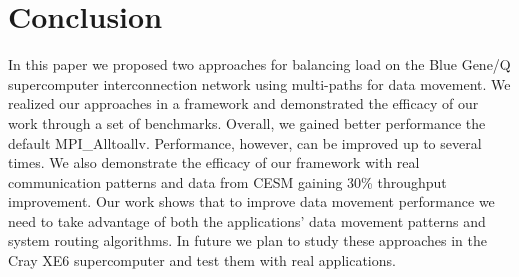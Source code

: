 \section{Conclusion}
\label{sec:conclusion}

In this paper we proposed two approaches for balancing load on the Blue Gene/Q supercomputer interconnection network using multi-paths for data movement. We realized our approaches in a framework and demonstrated the efficacy of our work through a set of benchmarks. Overall, we gained better performance the default MPI\_Alltoallv. Performance, however, can be improved up to several times. We also demonstrate the efficacy of our framework with real communication patterns and data from CESM gaining 30\% throughput improvement. Our work shows that to improve data movement performance we need to take advantage of both the applications' data movement patterns and system routing algorithms. In future we plan to study these approaches in the Cray XE6 supercomputer and test them with real applications.
